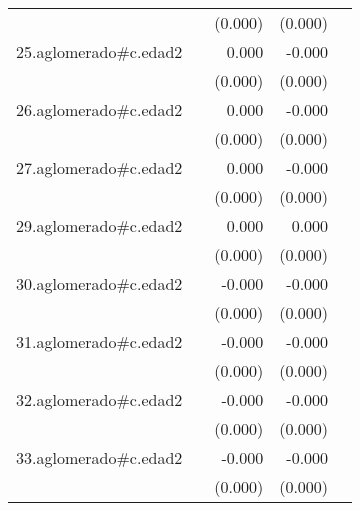 {\begin{longtable}{l*{4}{D{.}{.}{-1}}}
            &                     &     (0.000)         &     (0.000)         &                     \\
\addlinespace
25.aglomerado#c.edad2&                     &       0.000         &      -0.000         &                     \\
            &                     &     (0.000)         &     (0.000)         &                     \\
\addlinespace
26.aglomerado#c.edad2&                     &       0.000         &      -0.000         &                     \\
            &                     &     (0.000)         &     (0.000)         &                     \\
\addlinespace
27.aglomerado#c.edad2&                     &       0.000         &      -0.000         &                     \\
            &                     &     (0.000)         &     (0.000)         &                     \\
\addlinespace
29.aglomerado#c.edad2&                     &       0.000         &       0.000         &                     \\
            &                     &     (0.000)         &     (0.000)         &                     \\
\addlinespace
30.aglomerado#c.edad2&                     &      -0.000\sym{*}  &      -0.000\sym{***}&                     \\
            &                     &     (0.000)         &     (0.000)         &                     \\
\addlinespace
31.aglomerado#c.edad2&                     &      -0.000         &      -0.000         &                     \\
            &                     &     (0.000)         &     (0.000)         &                     \\
\addlinespace
32.aglomerado#c.edad2&                     &      -0.000         &      -0.000\sym{***}&                     \\
            &                     &     (0.000)         &     (0.000)         &                     \\
\addlinespace
33.aglomerado#c.edad2&                     &      -0.000         &      -0.000\sym{***}&                     \\
            &                     &     (0.000)         &     (0.000)         &                     \\

\end{longtable}}
